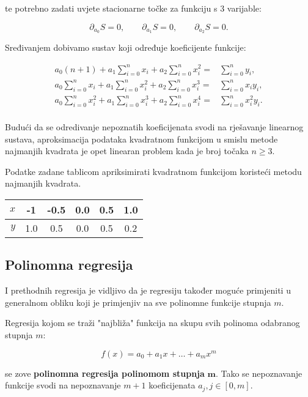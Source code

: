 te potrebno zadati uvjete stacionarne točke za funkciju s 3 varijable:

$$
\partial_{a_0}S=0,\qquad\partial_{a_1}S=0,\qquad\partial_{a_2}S=0.
$$

Sređivanjem dobivamo sustav koji određuje koeficijente funkcije:

\begin{align*}
    a_0(n+1)+a_1\sum_{i=0}^nx_i+a_2\sum_{i=0}^nx_i^2=&\sum_{i=0}^ny_i,\\
    a_0\sum_{i=0}^nx_i+a_1\sum_{i=0}^nx_i^2+a_2\sum_{i=0}^nx_i^3=&\sum_{i=0}^nx_iy_i,\\
    a_0\sum_{i=0}^nx_i^2+a_1\sum_{i=0}^nx_i^3+a_2\sum_{i=0}^nx_i^4=&\sum_{i=0}^nx_i^2y_i.\\
\end{align*}

Budući da se odredivanje nepoznatih koeficijenata svodi na rješavanje linearnog sustava, aproksimacija podataka kvadratnom funkcijom u smislu metode najmanjih kvadrata je opet linearan problem kada je broj točaka $n\geq3$.

\begin{examplebox}
    Podatke zadane tablicom apriksimirati kvadratnom funkcijom koristeći metodu najmanjih kvadrata.

    \center
    \begin{tabular}{r|c|c|c|c|c}
        $x$ & -1 & -0.5 & 0.0 & 0.5 & 1.0 \\
        \hline
        $y$ & 1.0 & 0.5 & 0.0 & 0.5 & 0.2 \\
    \end{tabular}
\end{examplebox}

\newpage

\subsection{Polinomna regresija}

I prethodnih regresija je vidljivo da je regresiju također moguće primjeniti u generalnom obliku koji je primjenjiv na sve polinomne funkcije stupnja $m$.

Regresija kojom se traži "najbliža" funkcija na skupu svih polinoma odabranog stupnja $m$:

$$
f(x) = a_0+a_1x+\dots+a_mx^m
$$

se zove \textbf{polinomna regresija polinomom stupnja} $\mathbf m$. Tako se nepoznavanje funkcije svodi na nepoznavanje $m+1$ koeficijenata $a_j, j\in[0,m]$.


